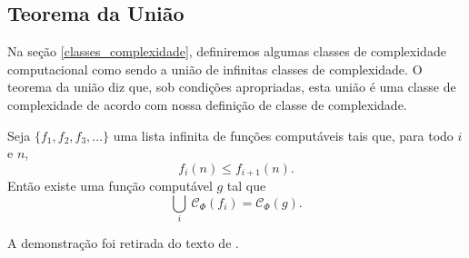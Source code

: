 \subsection{Teorema da União}

Na seção \ref{classes_complexidade},
definiremos algumas classes de complexidade computacional
como sendo a união de infinitas classes de complexidade.
O teorema da união diz que,
sob condições apropriadas,
esta união é uma classe de complexidade
de acordo com nossa definição de classe de complexidade.

\begin{theorem}
    \label{teorema_da_uniao}
    Seja $\{f_1, f_2, f_3, \dots\}$ uma lista infinita de funções computáveis
    tais que, para todo $i$ e $n$,
    \begin{equation*}
        f_i(n) \leq f_{i+1}(n).
    \end{equation*}
    Então existe uma função computável $g$
    tal que
    \begin{equation*}
        \bigcup_i \ \mathcal C_\Phi(f_i) = \mathcal C_\Phi(g).
    \end{equation*}
\end{theorem}

A demonstração foi retirada do texto de .

